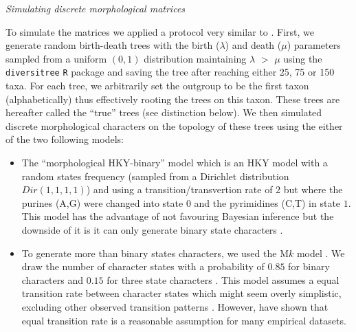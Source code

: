 \documentclass[12pt,letterpaper]{article}
\renewcommand{\subsection}[1]{%
\bigskip
\begin{center}
\begin{large}
\normalfont\itshape #1
\end{large}
\end{center}}
\begin{document}
\subsection{Simulating discrete morphological matrices}
To simulate the matrices we applied a protocol very similar to \cite{Guillerme2016146}.
First, we generate random birth-death trees with the birth ($\lambda$) and death ($\mu$) parameters sampled from a uniform $(0,1)$ distribution maintaining $\lambda$ $>$ $\mu$ using the \texttt{diversitree} \texttt{R} package \citep[v0.9-8;][]{fitzjohndiversitree2012} and saving the tree after reaching either 25, 75 or 150 taxa.
For each tree, we arbitrarily set the outgroup to be the first taxon (alphabetically) thus effectively rooting the trees on this taxon.
These trees are hereafter called the ``true'' trees (see distinction below).
We then simulated discrete morphological characters on the topology of these trees using the either of the two following models:
\begin{itemize}
    \item The ``morphological HKY-binary'' model \citep{OReilly20160081} which is an HKY model \citep{HKY85} with a random states frequency (sampled from a Dirichlet distribution $Dir(1,1,1,1)$) and using a transition/transvertion rate of $2$ \citep{douadycomparison2003} but where the purines (A,G) were changed into state $0$ and the pyrimidines (C,T) in state $1$.
    This model has the advantage of not favouring Bayesian inference \citep[since it doesn't use an M$k$ model;][; see discussion]{OReilly20160081} but the downside of it is it can only generate binary state characters \citep[or 4 states;][]{puttick2017uncertain}.
    \item To generate more than binary states characters, we used the M$k$ model \citep{lewisa2001}.
    We draw the number of character states with a probability of $0.85$ for binary characters and $0.15$ for three state characters \citep[from empirical observations in: ][]{Guillerme2016146,ZouConvergence}.
    This model assumes a equal transition rate between character states which might seem overly simplistic, excluding other observed transition patterns \citep[e.g. Dollo characters;][]{Dollo,wright2015came}.
    However, \cite{Wright01072016} have shown that equal transition rate is a reasonable assumption for many empirical datasets.
\end{itemize}
\end{document}
